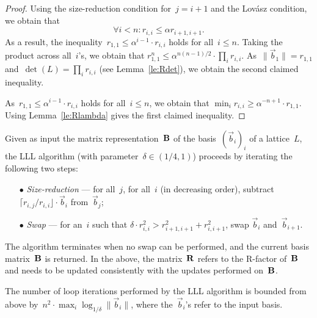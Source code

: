 \begin{proof}
Using the size-reduction condition for~$j=i+1$ and the Lov\'asz condition, we obtain that
\[
\forall i<n: r_{i,i} \leq \alpha r_{i+1,i+1}.
\]
As a result, the inequality~$r_{1,1} \leq \alpha^{i-1}\cdot r_{i,i}$ holds for all~$i \leq n$. Taking the product across all~$i$'s, we obtain that $r_{1,1}^n \leq \alpha^{n(n-1)/2} \cdot \prod_i r_{i,i}$. As~$\|\vec{b}_1\| = r_{1,1}$ and~$\det(L) = \prod_i r_{i,i}$ (see Lemma~\ref{le:Rdet}), we obtain the second claimed inequality. 

As~$r_{1,1} \leq \alpha^{i-1} \cdot r_{i,i}$ holds for all~$i \leq n$, we obtain that  $\min_i r_{i,i} \geq \alpha^{-n+1}\cdot  r_{1,1}$. Using Lemma~\ref{le:Rlambda} gives the first claimed inequality. 
\end{proof}

Given as input the matrix representation~${\bf B}$ of the basis~$(\vec{b}_i)_i$ of a lattice~$L$, the LLL algorithm (with parameter~$\delta \in (1/4,1)$) proceeds 
by iterating the following two steps: 
\begin{itemize}
\item[$\bullet$] \emph{Size-reduction} --- for all~$j$, for all~$i$ (in decreasing order), subtract~$\lceil r_{i,j}/r_{i,i} \rfloor \cdot \vec{b}_i$ from~$\vec{b}_j$; 
\item[$\bullet$] \emph{Swap} --- for an~$i$ such that $\delta \cdot r_{i,i}^2 >  r_{i+1,i+1}^2+r_{i,i+1}^2$, swap $\vec{b}_i$ and~$\vec{b}_{i+1}$. 
\end{itemize}
The algorithm terminates when no swap can be performed, and the current basis matrix~${\bf B}$ is returned. 
In the above, the matrix~${\bf R}$ refers to the R-factor of~${\bf B}$ and needs to be updated consistently with the updates performed on~${\bf B}$. 

\begin{lemma}
The number of loop iterations performed by the LLL algorithm is bounded from above by~$n^2 \cdot \max_i \log_{1/\delta} \|\vec{b}_i\|$,
where the~$\vec{b}_i$'s refer to the input basis. 
\end{lemma}

